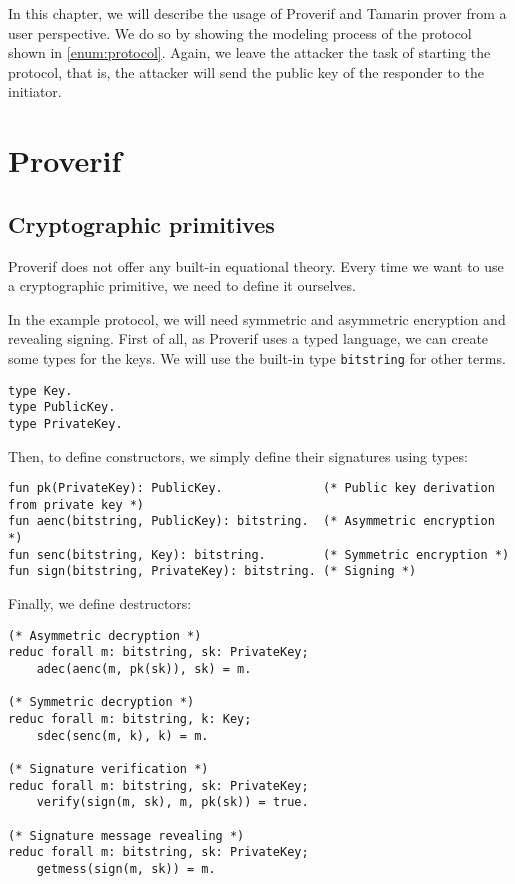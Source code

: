 
In this chapter, we will describe the usage of Proverif and Tamarin prover from a user perspective. We do so by showing the modeling process of the protocol shown in \cref{enum:protocol}. Again, we leave the attacker the task of starting the protocol, that is, the attacker will send the public key of the responder to the initiator.


\lstset{language=proverif}
\section{Proverif}

\subsection{Cryptographic primitives}
Proverif does not offer any built-in equational theory. Every time we want to use a cryptographic primitive, we need to define it ourselves.

In the example protocol, we will need symmetric and asymmetric encryption and revealing signing. First of all, as Proverif uses a typed language, we can create some types for the keys. We will use the built-in type \lstinline{bitstring} for other terms.

\begin{lstlisting}
type Key.
type PublicKey.
type PrivateKey.
\end{lstlisting}

Then, to define constructors, we simply define their signatures using types:

\begin{lstlisting}
fun pk(PrivateKey): PublicKey.              (* Public key derivation from private key *)
fun aenc(bitstring, PublicKey): bitstring.  (* Asymmetric encryption *)
fun senc(bitstring, Key): bitstring.        (* Symmetric encryption *)
fun sign(bitstring, PrivateKey): bitstring. (* Signing *)
\end{lstlisting}

Finally, we define destructors:
\begin{lstlisting}
(* Asymmetric decryption *)
reduc forall m: bitstring, sk: PrivateKey;
    adec(aenc(m, pk(sk)), sk) = m.
  
(* Symmetric decryption *)
reduc forall m: bitstring, k: Key;
    sdec(senc(m, k), k) = m.

(* Signature verification *)
reduc forall m: bitstring, sk: PrivateKey;
    verify(sign(m, sk), m, pk(sk)) = true.

(* Signature message revealing *)
reduc forall m: bitstring, sk: PrivateKey;
    getmess(sign(m, sk)) = m.
\end{lstlisting}

